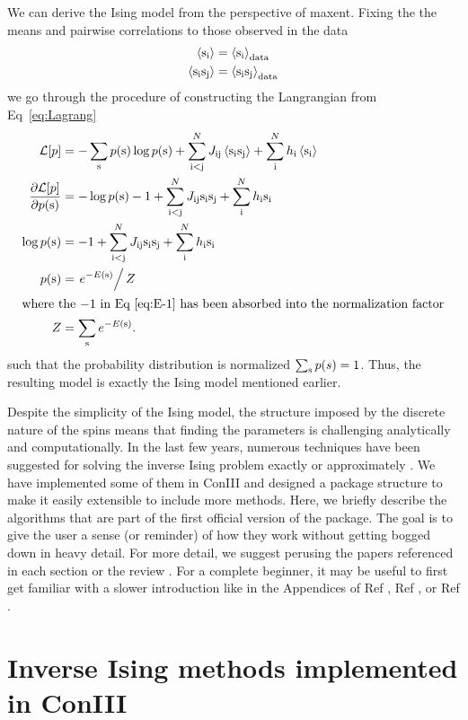 \documentclass[aps,prl,twocolumn,nofootinbib]{revtex4-1}
\begin{document}
We can derive the Ising model from the perspective of maxent. Fixing the the means and pairwise correlations to those observed in the data
\begin{align}
	\left<{\rm s}_{\rm i}\right> &= \left<{\rm s}_{\rm i}\right>_{\rm data} \\
	\left<{\rm s}_{\rm i}{\rm s}_{\rm j}\right> &= \left<{\rm s}_{\rm i}{\rm s}_{\rm j}\right>_{\rm data}
\end{align}
we go through the procedure of constructing the Langrangian from Eq~\ref{eq:Lagrang}
\begin{align}
	\mathcal{L}[p] &= -\sum_{\rm s} p({\rm s})\log p({\rm s}) +\sum_{\rm i<j}^N J_{\rm ij}\left<{\rm s}_{\rm i}{\rm s}_{\rm j}\right> +\sum_{\rm i}^Nh_{\rm i}\left<{\rm s}_{\rm i}\right>\\
	\frac{\partial\mathcal{L}[p]}{\partial p({\rm s})} &= -\log p({\rm s})-1 +\sum_{\rm i<j}^N J_{\rm ij}{\rm s}_{\rm i}{\rm s}_{\rm j} +\sum_{\rm i}^Nh_{\rm i}{\rm s}_{\rm i}\\
	\log p({\rm s}) &= -1 +\sum_{\rm i<j}^N J_{\rm ij}{\rm s}_{\rm i}{\rm s}_{\rm j} +\sum_{\rm i}^Nh_{\rm i}{\rm s}_{\rm i}\label{eq:E-1}\\
	p({\rm s}) &= \left.e^{-E({\rm s})}\right/Z\\
\intertext{where the $-1$ in Eq \ref{eq:E-1} has been absorbed into the normalization factor}
	Z &= \sum_{{\rm s}} e^{-E({\rm s})}.
\end{align}
such that the probability distribution is normalized $\sum_{{\rm s}} p(s)=1$.
Thus, the resulting model is exactly the Ising model mentioned earlier.

Despite the simplicity of the Ising model, the structure imposed by the discrete nature of the spins means that finding the parameters is challenging analytically and computationally. In the last few years, numerous techniques have been suggested for solving the inverse Ising problem exactly or approximately \cite{Nguyen:2017ww}. We have implemented some of them in ConIII and designed a package structure to make it easily extensible to include more methods.  Here, we briefly describe the algorithms that are part of the first official version of the package. The goal is to give the user a sense (or reminder) of how they work without getting bogged down in heavy detail. For more detail, we suggest perusing the papers referenced in each section or the review \cite{Nguyen:2017ww}. For a complete beginner, it may be useful to first get familiar with a slower introduction like in the Appendices of Ref \cite{Lee:2015ev}, Ref \cite{Bialek:2012ueb}, or Ref \cite{Bretthorst:2003ua}.



\section{Inverse Ising methods implemented in ConIII}
\end{document}
